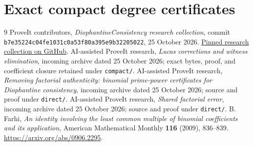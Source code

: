 \documentclass[11pt]{article}
\theoremstyle{definition}
\begin{document}
\section{Exact compact degree certificates}


\begin{thebibliography}{9}
 ProveIt contributors, \emph{DiophantineConsistency research
collection}, commit
\texttt{b7e35224c04fe1031c0a53f80a395e9b32205022}, 25 October 2026.
\href{https://github.com/VladimirReshetnikov/ProveIt/tree/b7e35224c04fe1031c0a53f80a395e9b32205022/Computability/DiophantineConsistency}{Pinned research collection on GitHub}.
 AI-assisted ProveIt research, \emph{Lucas corrections and
witness elimination}, incoming archive dated 25 October 2026; exact bytes,
proof, and coefficient closure retained under \texttt{compact/}.
 AI-assisted ProveIt research, \emph{Removing factorial
authenticity: binomial prime-power certificates for Diophantine consistency},
incoming archive dated 25 October 2026; source and proof under \texttt{direct/}.
 AI-assisted ProveIt research, \emph{Shared factorial
error}, incoming archive dated 25 October 2026; source and proof under
\texttt{direct/}.
 B. Farhi, \emph{An identity involving the least common multiple
of binomial coefficients and its application}, American Mathematical
Monthly \textbf{116} (2009), 836--839.
\url{https://arxiv.org/abs/0906.2295}.
\end{thebibliography}
\end{document}
